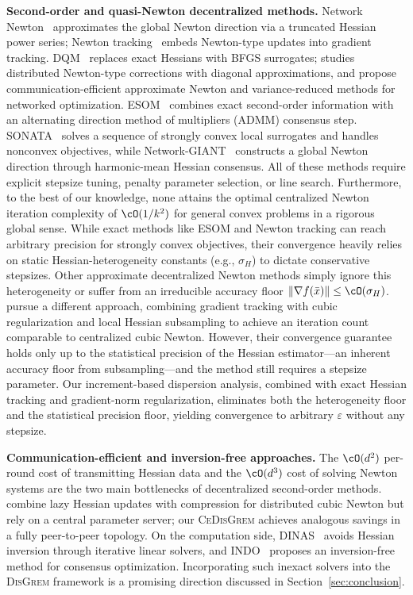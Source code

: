 \documentclass[review,onefignum,onetabnum]{siamart171218}
\begin{document}
	\noindent\textbf{Second-order and quasi-Newton decentralized methods.}
	Network Newton~\citep{mokhtari2017networknewton} approximates
	the global Newton direction via a truncated Hessian power series;
	Newton tracking~\citep{zhang2021newtontracking} embeds Newton-type
	updates into gradient tracking.
	DQM~\citep{eisen2017dqn} replaces exact Hessians with BFGS
	surrogates; \citet{bajovic2017newton} studies distributed
	Newton-type corrections with diagonal approximations, and
	\citet{li2020communication} propose communication-efficient
	approximate Newton and variance-reduced methods for networked optimization.
	ESOM~\citep{mokhtari2016esom} combines exact second-order information
	with an alternating direction method of multipliers (ADMM) consensus step.
	SONATA~\citep{sun2022sonata} solves a sequence of strongly convex
	local surrogates and handles nonconvex objectives, while
	Network-GIANT~\citep{maritan2023networkgiant} constructs a global Newton
	direction through harmonic-mean Hessian consensus.
	All of these methods require explicit stepsize tuning, penalty
	parameter selection, or line search.
	Furthermore, to the best of our knowledge, none attains the optimal
	centralized Newton iteration complexity of $\cO(1/k^2)$ for general
	convex problems in a rigorous global sense.
	While exact methods like ESOM and Newton tracking can reach
	arbitrary precision for strongly convex objectives, their
	convergence heavily relies on static Hessian-heterogeneity
	constants (e.g., $\sigma_H$) to dictate conservative stepsizes.
	Other approximate decentralized Newton methods simply ignore this
	heterogeneity or suffer from an irreducible accuracy floor
	$\|\nabla f(\bar x)\|\le\cO(\sigma_H)$.
	\citet{daneshmand2021newton} pursue a different approach, combining
	gradient tracking with cubic regularization and local Hessian
	subsampling to achieve an iteration count comparable to centralized
	cubic Newton.
	However, their convergence guarantee holds only up to the statistical
	precision of the Hessian estimator---an inherent accuracy floor from
	subsampling---and the method still requires a stepsize parameter.
	Our increment-based dispersion analysis, combined with
	exact Hessian tracking and gradient-norm regularization, eliminates
	both the heterogeneity floor and the statistical precision floor,
	yielding convergence to arbitrary $\varepsilon$ without any stepsize.

	\noindent\textbf{Communication-efficient and inversion-free approaches.}
	The $\cO(d^2)$ per-round cost of transmitting Hessian data and
	the $\cO(d^3)$ cost of solving Newton systems are the two main
	bottlenecks of decentralized second-order methods.
	\citet{zhang2024cubic} combine lazy Hessian updates with
	compression for distributed cubic Newton but rely on a central
	parameter server; our \textsc{CeDisGrem} achieves analogous
	savings in a fully peer-to-peer topology.
	On the computation side, DINAS~\citep{jakovetic2025dinas} avoids
	Hessian inversion through iterative linear solvers, and
	INDO~\citep{yuan2023indo} proposes an inversion-free method for
	consensus optimization.
	Incorporating such inexact solvers into the \textsc{DisGrem}
	framework is a promising direction discussed in
	Section~\ref{sec:conclusion}.
\end{document}
